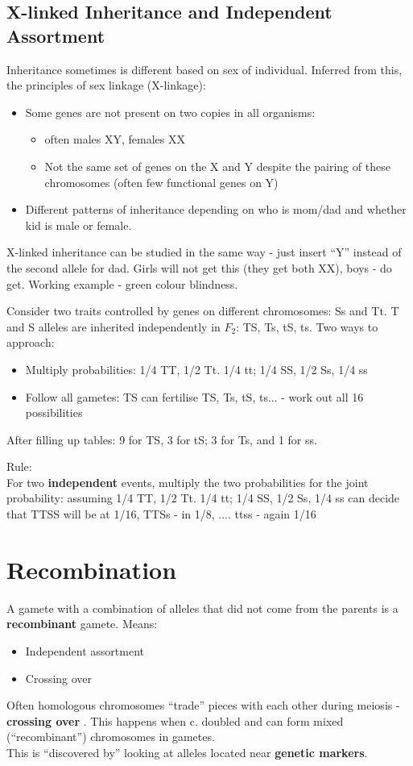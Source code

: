 \documentclass{scrartcl}
\begin{document}
\subsection{X-linked Inheritance and Independent Assortment}
\label{sec:2-6}
Inheritance sometimes is different based on sex of individual. Inferred from
this, the principles of sex linkage (X-linkage):
\begin{itemize}
\item Some genes are not present on two copies in all organisms:
  \begin{itemize}
  \item often males XY, females XX
  \item Not the same set of genes on the X and Y despite the pairing of these
    chromosomes (often few functional genes on Y)
  \end{itemize}
\item Different patterns of inheritance depending on who is mom/dad and whether
  kid is male or female.
\end{itemize}
X-linked inheritance can be studied in the same way - just insert ``Y'' instead
of the second allele for dad. Girls will not get this (they get both XX), boys -
do get. Working example - green colour blindness.

Consider two traits controlled by genes on different chromosomes: Ss and Tt. T
and S alleles are inherited independently in $F_2$: TS, Ts, tS, ts. Two ways to
approach:
\begin{itemize}
\item Multiply probabilities: 1/4 TT, 1/2 Tt. 1/4 tt; 1/4 SS, 1/2 Ss, 1/4 ss
\item Follow all gametes: TS can fertilise TS, Ts, tS, ts... - work out all 16
  possibilities
\end{itemize}
After filling up tables: 9 for TS, 3 for tS; 3 for Ts, and 1 for ss.


Rule:\\
For two {\bf independent } events, multiply the two probabilities for the joint probability: assuming 1/4 TT, 1/2 Tt. 1/4 tt; 1/4 SS, 1/2 Ss, 1/4 ss can decide that TTSS will be at 1/16, TTSs - in 1/8, .... ttss - again 1/16

\section{Recombination}
\label{sec:3-1}
A gamete with a combination of alleles that did not come from the parents is a
{\bf recombinant } gamete. Means:
\begin{itemize}
\item Independent assortment
\item Crossing over
\end{itemize}
Often homologous chromosomes ``trade'' pieces with each other during meiosis -
{\bf crossing over }. This happens when c. doubled and can form mixed
(``recombinant'') chromosomes in gametes.\\
This is ``discovered by'' looking at alleles located near {\bf genetic markers}.
\end{document}
